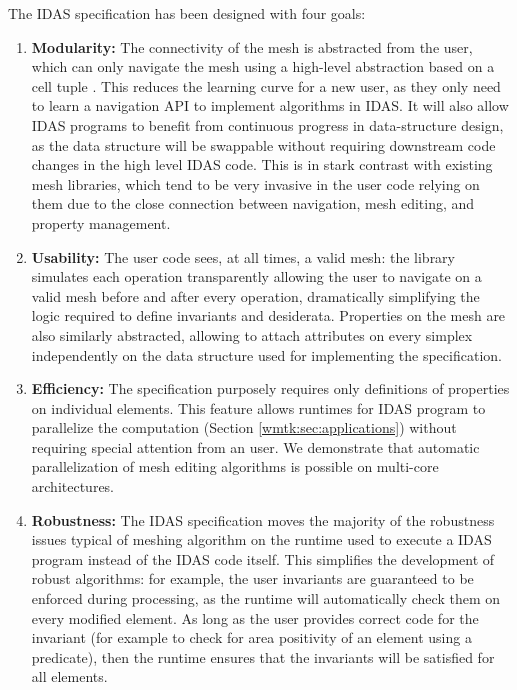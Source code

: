 The IDAS specification has been designed with four goals:
\begin{enumerate}
    \item \textbf{Modularity:} The connectivity of the mesh is abstracted from the user, which can only navigate the mesh using a high-level abstraction based on a cell tuple \cite{Brisson1989}. This reduces the learning curve for a new user, as they only need to learn a navigation API to implement algorithms in IDAS. It will also allow IDAS programs to benefit from continuous progress in data-structure design, as the data structure will be swappable without requiring downstream code changes in the high level IDAS code. This is in stark contrast with existing mesh libraries, which tend to be very invasive in the user code relying on them due to the close connection between navigation, mesh editing, and property management.
    \item \textbf{Usability:} The user code sees, at all times, a valid mesh: the library simulates each operation transparently allowing the user to navigate on a valid mesh before and after every operation, dramatically simplifying the logic required to define invariants and desiderata. Properties on the mesh are also similarly abstracted, allowing to attach attributes on every simplex independently on the data structure used for implementing the specification.
    \item \textbf{Efficiency:} The specification purposely requires only definitions of properties on individual elements. This feature allows runtimes for IDAS program to  parallelize the computation (Section \ref{wmtk:sec:applications}) without requiring special attention from an user. We demonstrate that automatic parallelization of mesh editing algorithms is possible on multi-core architectures.
    \item \textbf{Robustness:} The IDAS specification moves the majority of the robustness issues typical of meshing algorithm on the runtime used to execute a IDAS program instead of the IDAS code itself. This simplifies the development of robust algorithms: for example, the user invariants are guaranteed to be enforced during processing, as the runtime will automatically check them on every modified element. As long as the user provides correct code for the invariant (for example to check for area positivity of an element using a predicate), then the runtime ensures that the invariants will be satisfied for all elements.
\end{enumerate}


